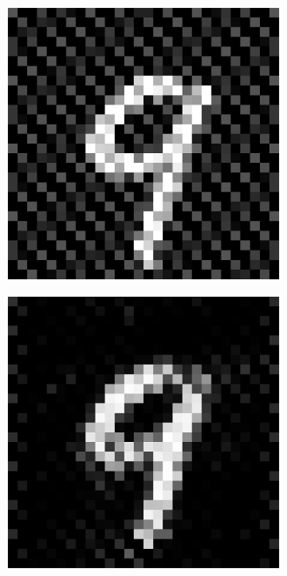 \documentclass{article} %
\begin{document}
\begin{figure}
\begin{subfigure}{0.22\textwidth}
\end{subfigure}
\hfill
\begin{subfigure}{0.22\textwidth}
\includegraphics[width = \textwidth]{figures-MNIST/highblur.eps}
\end{subfigure}
\hfill
\begin{subfigure}{0.22\textwidth}
\includegraphics[width = \textwidth]{figures-MNIST/high-1.eps}

\end{subfigure}
\end{figure}
\end{document}
